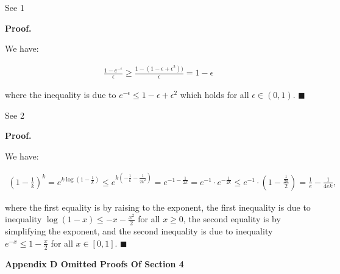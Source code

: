 \documentclass[10pt,a4paper]{article}
\begin{document}
See 1\par




\par\medskip\noindent\textbf{Proof.}\par



We have:\par


\[\begin{gathered}
\displaystyle\frac{1-e^{-\epsilon}}{\epsilon}\geq\frac{1-(1-\epsilon+\epsilon^{2}))}{\epsilon}=1-\epsilon
\end{gathered}\]


where the inequality is due to $e^{-\epsilon}\leq 1-\epsilon+\epsilon^{2}$ which holds for all $\epsilon\in(0,1)$.
\ensuremath{\blacksquare}\par





See 2\par




\par\medskip\noindent\textbf{Proof.}\par



We have:\par


\[\begin{gathered}
\displaystyle\left(1-\frac{1}{k}\right)^{k}=e^{k\log\left(1-\frac{1}{k}\right)}\leq e^{k\left(-\frac{1}{k}-\frac{1}{2k^{2}}\right)}=e^{-1-\frac{1}{2k}}=e^{-1}\cdot e^{-\frac{1}{2k}}\leq e^{-1}\cdot\left(1-\frac{\frac{1}{2k}}{2}\right)=\frac{1}{e}-\frac{1}{4ek},
\end{gathered}\]


where the first equality is by raising to the exponent, the first inequality is due to inequality $\log\left(1-x\right)\leq-x-\frac{x^{2}}{2}$ for all $x\geq 0$, the second equality is by simplifying the exponent, and the second inequality is due to inequality $e^{-x}\leq 1-\frac{x}{2}$ for all $x\in[0,1]$.
\ensuremath{\blacksquare}\par







\par\medskip\noindent\textbf{Appendix D Omitted Proofs Of Section 4}\par
\end{document}
